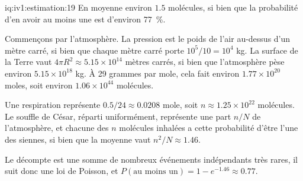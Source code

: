 \begin{solution}{iq:iv1:estimation:19}
En moyenne environ $1.5$ molécules, si bien que la probabilité d'en avoir au moins une est d'environ 77~\%.

Commençons par l'atmosphère. La pression est le poids de l'air au-dessus d'un mètre carré, si bien que chaque mètre carré porte $10^5/10 = 10^4$ kg. La surface de la Terre vaut $4\pi R^2 \approx 5.15 \times 10^{14}$ mètres carrés, si bien que l'atmosphère pèse environ $5.15 \times 10^{18}$ kg. À 29 grammes par mole, cela fait environ $1.77 \times 10^{20}$ moles, soit environ $1.06 \times 10^{44}$ molécules.

Une respiration représente $0.5/24 \approx 0.0208$ mole, soit $n \approx 1.25 \times 10^{22}$ molécules. Le souffle de César, réparti uniformément, représente une part $n/N$ de l'atmosphère, et chacune des $n$ molécules inhalées a cette probabilité d'être l'une des siennes, si bien que la moyenne vaut $n^2/N \approx 1.46$.

Le décompte est une somme de nombreux événements indépendants très rares, il suit donc une loi de Poisson, et $P(\text{au moins un}) = 1 - e^{-1.46} \approx 0.77$.

\end{solution}

